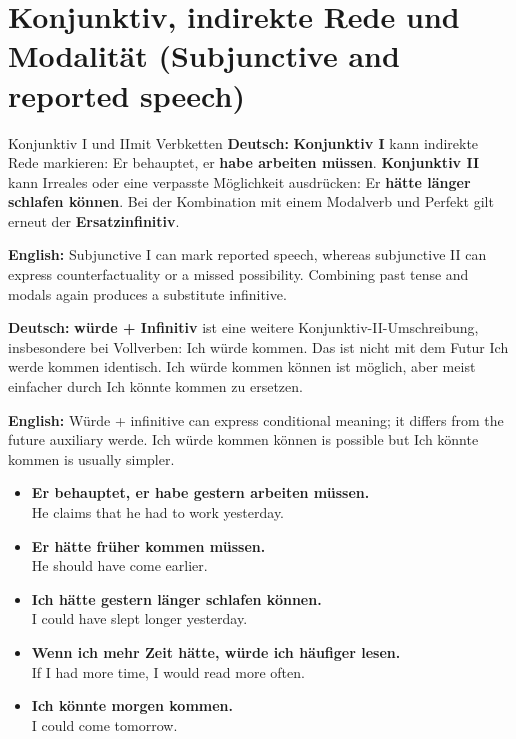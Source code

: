 \documentclass[a4paper,11pt]{article}
\newcommand{\GermanText}[1]{\textbf{Deutsch: }#1\par}
\newcommand{\EnglishText}[1]{{\small\color{SoftGray}\textbf{English: }#1\par}}
\newcommand{\ExampleItem}[2]{\item \textbf{#1}\\{\small\color{SoftGray}#2}}
\newcommand{\DEEN}[2]{\GermanText{#1}\EnglishText{#2}}
\newcommand{\Pair}[2]{\ExampleItem{#1}{#2}}
\begin{document}
\section{Konjunktiv, indirekte Rede und Modalität \textnormal{(Subjunctive and reported speech)}}
\begin{grammarentry}{Konjunktiv I und II}{mit Verbketten}
\DEEN{\textbf{Konjunktiv I} kann indirekte Rede markieren: \glqq Er behauptet, er \textbf{habe arbeiten müssen}\grqq. \textbf{Konjunktiv II} kann Irreales oder eine verpasste Möglichkeit ausdrücken: \glqq Er \textbf{hätte länger schlafen können}\grqq. Bei der Kombination mit einem Modalverb und Perfekt gilt erneut der \textbf{Ersatzinfinitiv}.}{Subjunctive I can mark reported speech, whereas subjunctive II can express counterfactuality or a missed possibility. Combining past tense and modals again produces a substitute infinitive.}
\DEEN{\textbf{würde + Infinitiv} ist eine weitere Konjunktiv-II-Umschreibung, insbesondere bei Vollverben: \glqq Ich würde kommen\grqq. Das ist nicht mit dem Futur \glqq Ich werde kommen\grqq{} identisch. \glqq Ich würde kommen können\grqq{} ist möglich, aber meist einfacher durch \glqq Ich könnte kommen\grqq{} zu ersetzen.}{Würde + infinitive can express conditional meaning; it differs from the future auxiliary werde. Ich würde kommen können is possible but Ich könnte kommen is usually simpler.}
\end{grammarentry}
\begin{exbox}\begin{itemize}
\Pair{Er behauptet, er habe gestern arbeiten müssen.}{He claims that he had to work yesterday.}
\Pair{Er hätte früher kommen müssen.}{He should have come earlier.}
\Pair{Ich hätte gestern länger schlafen können.}{I could have slept longer yesterday.}
\Pair{Wenn ich mehr Zeit hätte, würde ich häufiger lesen.}{If I had more time, I would read more often.}
\Pair{Ich könnte morgen kommen.}{I could come tomorrow.}
\end{itemize}\end{exbox}
\end{document}
